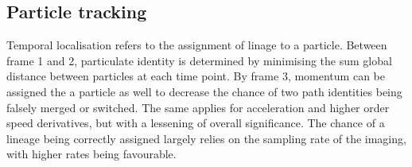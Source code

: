 \subsection{Particle tracking}

Temporal localisation refers to the assignment of linage to a particle.
Between frame 1 and 2, particulate identity is determined by minimising the sum global distance between particles at each time point.
By frame 3, momentum can be assigned the a particle as well to decrease the chance of two path identities being falsely merged or switched.
The same applies for acceleration and higher order speed derivatives, but with a lessening of overall significance.
The chance of a lineage being correctly assigned largely relies on the sampling rate of the imaging, with higher rates being favourable.




